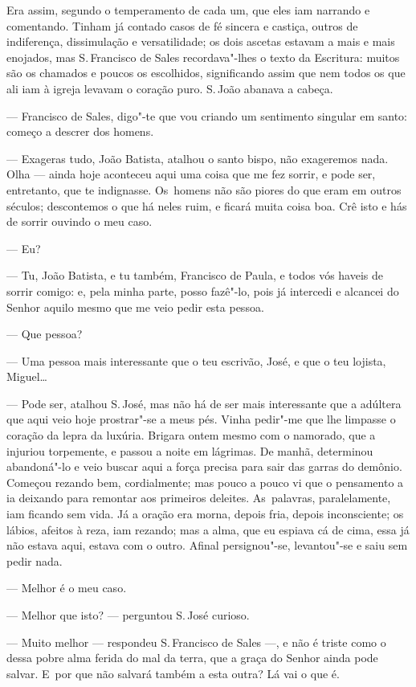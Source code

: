 \begin{linenumbers}
Era assim, segundo o temperamento de cada um, que eles iam narrando e
comentando. Tinham já contado casos de fé sincera e castiça, outros de
indiferença, dissimulação e versatilidade; os dois ascetas estavam a
mais e mais enojados, mas S.\,Francisco de Sales recordava"-lhes o texto
da Escritura: muitos são os chamados e poucos os escolhidos,
significando assim que nem todos os que ali iam à igreja levavam o
coração puro. S.\,João abanava a cabeça.

--- Francisco de Sales, digo"-te que vou criando um sentimento singular em
santo: começo a descrer dos homens.

--- Exageras tudo, João Batista, atalhou o santo bispo, não exageremos
nada. Olha --- ainda hoje aconteceu aqui uma coisa que me fez sorrir, e
pode ser, entretanto, que te indignasse. Os~homens não são piores do que
eram em outros séculos; descontemos o que há neles ruim, e ficará muita
coisa boa. Crê isto e hás de sorrir ouvindo o meu caso.

--- Eu?

--- Tu, João Batista, e tu também, Francisco de Paula, e todos vós haveis
de sorrir comigo: e, pela minha parte, posso fazê"-lo, pois já intercedi
e alcancei do Senhor aquilo mesmo que me veio pedir esta pessoa.

--- Que pessoa?

--- Uma pessoa mais interessante que o teu escrivão, José, e que o teu
lojista, Miguel\ldots{}

--- Pode ser, atalhou S.\,José, mas não há de ser mais interessante que a
adúltera que aqui veio hoje prostrar"-se a meus pés. Vinha pedir"-me que
lhe limpasse o coração da lepra da luxúria. Brigara ontem mesmo com o
namorado, que a injuriou torpemente, e passou a noite em lágrimas. De
manhã, determinou abandoná"-lo e veio buscar aqui a força precisa para
sair das garras do demônio. Começou rezando bem, cordialmente; mas pouco
a pouco vi que o pensamento a ia deixando para remontar aos primeiros
deleites. As~palavras, paralelamente, iam ficando sem vida. Já a oração
era morna, depois fria, depois inconsciente; os lábios, afeitos à reza,
iam rezando; mas a alma, que eu espiava cá de cima, essa já não estava
aqui, estava com o outro. Afinal persignou"-se, levantou"-se e saiu sem
pedir nada.

--- Melhor é o meu caso.

--- Melhor que isto? --- perguntou S.\,José curioso.

--- Muito melhor --- respondeu S.\,Francisco de Sales ---, e não é triste
como o dessa pobre alma ferida do mal da terra, que a graça do Senhor
ainda pode salvar. E~por que não salvará também a esta outra? Lá vai o
que é.


\end{linenumbers}
